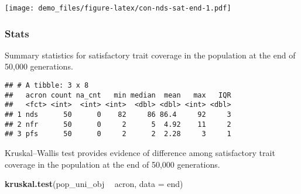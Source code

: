 \documentclass[]{book}
\newenvironment{Shaded}{\begin{snugshade}}{\end{snugshade}}
\newcommand{\DataTypeTok}[1]{\textcolor[rgb]{0.13,0.29,0.53}{#1}}
\newcommand{\KeywordTok}[1]{\textcolor[rgb]{0.13,0.29,0.53}{\textbf{#1}}}
\newcommand{\NormalTok}[1]{#1}
\newcommand{\OperatorTok}[1]{\textcolor[rgb]{0.81,0.36,0.00}{\textbf{#1}}}
\newcommand{\OtherTok}[1]{\textcolor[rgb]{0.56,0.35,0.01}{#1}}
\newcommand{\StringTok}[1]{\textcolor[rgb]{0.31,0.60,0.02}{#1}}
\begin{document}
\texttt{[image: demo\_files/figure-latex/con-nds-sat-end-1.pdf]}

\hypertarget{stats-9}{%
\subsubsection{Stats}\label{stats-9}}

Summary statistics for satisfactory trait coverage in the population at the end of 50,000 generations.

\begin{Shaded}
\end{Shaded}

\begin{verbatim}
## # A tibble: 3 x 8
##   acron count na_cnt   min median  mean   max   IQR
##   <fct> <int>  <int> <int>  <dbl> <dbl> <int> <dbl>
## 1 nds      50      0    82     86 86.4     92     3
## 2 nfr      50      0     2      5  4.92    11     2
## 3 pfs      50      0     2      2  2.28     3     1
\end{verbatim}

Kruskal--Wallis test provides evidence of difference among satisfactory trait coverage in the population at the end of 50,000 generations.

\begin{Shaded}
\begin{Highlighting}[]
\KeywordTok{kruskal.test}\NormalTok{(pop_uni_obj }\OperatorTok{~}\StringTok{ }\NormalTok{acron, }\DataTypeTok{data =}\NormalTok{ end)}
\end{Highlighting}
\end{Shaded}
\end{document}
